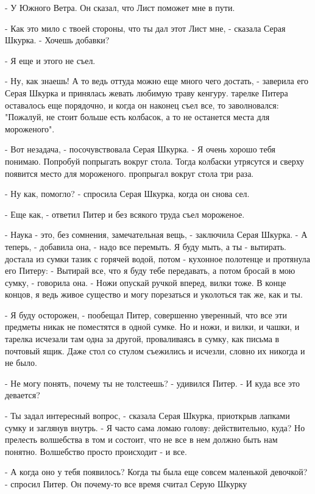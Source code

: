 \par- У Южного Ветра. Он сказал, что Лист поможет мне в пути.
\par- Как это мило с твоей стороны, что ты дал этот Лист мне, - 
сказала Серая Шкурка. - Хочешь добавки?
\par- Я еще и этого не съел.
\par- Ну, как знаешь! А то ведь оттуда можно еще много чего достать, - 
заверила его Серая Шкурка и принялась жевать любимую траву кенгуру.
 тарелке Питера оставалось еще порядочно, и когда он наконец 
съел все, то заволновался: "Пожалуй, не стоит больше есть колбасок, а 
то не останется места для мороженого".
\par- Вот незадача, - посочувствовала Серая Шкурка. - Я очень хорошо 
тебя понимаю. Попробуй попрыгать вокруг стола. Тогда колбаски 
утрясутся и сверху появится место для мороженого.
 пропрыгал вокруг стола три раза.
\par- Ну как, помогло? - спросила Серая Шкурка, когда он снова сел.
\par- Еще как, - ответил Питер и без всякого труда съел мороженое.
\par- Наука - это, без сомнения, замечательная вещь, - заключила Серая 
Шкурка. - А теперь, - добавила она, - надо все перемыть. Я буду мыть, 
а ты - вытирать.
 достала из сумки тазик с горячей водой, потом - кухонное 
полотенце и протянула его Питеру: - Вытирай все, что я буду тебе 
передавать, а потом бросай в мою сумку, - говорила она. - Ножи опускай 
ручкой вперед, вилки тоже. В конце концов, я ведь живое существо и 
могу порезаться и уколоться так же, как и ты.
\par- Я буду осторожен, - пообещал Питер, совершенно уверенный, что 
все эти предметы никак не поместятся в одной сумке. Но и ножи, и 
вилки, и чашки, и тарелка исчезали там одна за другой, проваливаясь в 
сумку, как письма в почтовый ящик. Даже стол со стулом съежились и 
исчезли, словно их никогда и не было.
\par- Не могу понять, почему ты не толстеешь? - удивился Питер. - И 
куда все это девается?
\par- Ты задал интересный вопрос, - сказала Серая Шкурка, приоткрыв 
лапками сумку и заглянув внутрь. - Я часто сама ломаю голову: 
действительно, куда? Но прелесть волшебства в том и состоит, что не 
все в нем должно быть нам понятно. Волшебство просто происходит - и 
все.
\par- А когда оно у тебя появилось? Когда ты была еще совсем маленькой 
девочкой? - спросил Питер. Он почему-то все время считал Серую Шкурку 

